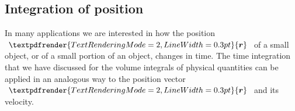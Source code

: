 \documentclass[a4paper,12pt,%
onecolumn,oneside,titlepage,%
british%
]{memoir}
\renewcommand*{\bm}[1]{\textpdfrender{TextRenderingMode=2,LineWidth=0.3pt}{\boldsymbol{#1}}}
\renewcommand*{\|}[1][]{\nonscript\:#1\vert\nonscript\:\mathopen{}}
\newcommand*{\yr}{\bm{r}}
\begin{document}
%

\subsection{Integration of position}
\label{sec:position_integration}

In many applications we are interested in how the position $\yr$ of a small object, or of a small portion of an object, changes in time. The time integration that we have discussed for the volume integrals of physical quantities can be applied in an analogous way to the position vector $\yr$ and its velocity.
\end{document}
